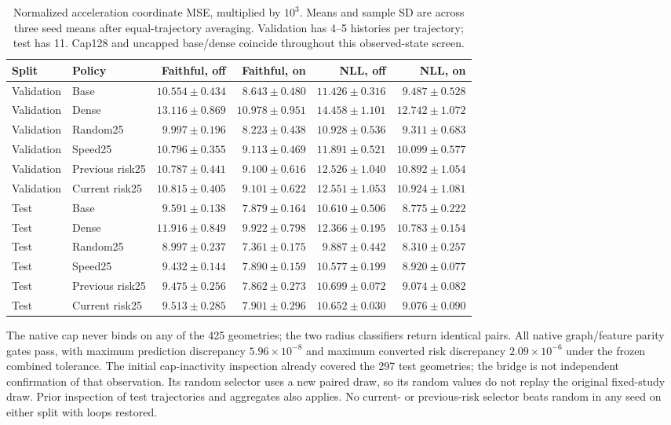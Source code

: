\begin{table}[ht]
\centering\small
\caption{Normalized acceleration coordinate MSE, multiplied by $10^3$.
Means and sample SD are across three seed means after equal-trajectory
averaging. Validation has 4--5 histories per trajectory; test has 11.
Cap128 and uncapped base/dense coincide throughout this observed-state screen.}
\label{tab:graph-convention-bridge}
\begin{tabular}{llrrrr}
\toprule
Split & Policy & Faithful, off & Faithful, on & NLL, off & NLL, on\\
\midrule
Validation & Base & $10.554\pm0.434$ & $8.643\pm0.480$ & $11.426\pm0.316$ & $9.487\pm0.528$\\
Validation & Dense & $13.116\pm0.869$ & $10.978\pm0.951$ & $14.458\pm1.101$ & $12.742\pm1.072$\\
Validation & Random25 & $9.997\pm0.196$ & $8.223\pm0.438$ & $10.928\pm0.536$ & $9.311\pm0.683$\\
Validation & Speed25 & $10.796\pm0.355$ & $9.113\pm0.469$ & $11.891\pm0.521$ & $10.099\pm0.577$\\
Validation & Previous risk25 & $10.787\pm0.441$ & $9.100\pm0.616$ & $12.526\pm1.040$ & $10.892\pm1.054$\\
Validation & Current risk25 & $10.815\pm0.405$ & $9.101\pm0.622$ & $12.551\pm1.053$ & $10.924\pm1.081$\\
\midrule
Test & Base & $9.591\pm0.138$ & $7.879\pm0.164$ & $10.610\pm0.506$ & $8.775\pm0.222$\\
Test & Dense & $11.916\pm0.849$ & $9.922\pm0.798$ & $12.366\pm0.195$ & $10.783\pm0.154$\\
Test & Random25 & $8.997\pm0.237$ & $7.361\pm0.175$ & $9.887\pm0.442$ & $8.310\pm0.257$\\
Test & Speed25 & $9.432\pm0.144$ & $7.890\pm0.159$ & $10.577\pm0.199$ & $8.920\pm0.077$\\
Test & Previous risk25 & $9.475\pm0.256$ & $7.862\pm0.273$ & $10.699\pm0.072$ & $9.074\pm0.082$\\
Test & Current risk25 & $9.513\pm0.285$ & $7.901\pm0.296$ & $10.652\pm0.030$ & $9.076\pm0.090$\\
\midrule
\end{tabular}
\end{table}

The native cap never binds on any of the 425 geometries; the two radius
classifiers return identical pairs. All native graph/feature parity gates pass,
with maximum prediction discrepancy $5.96\times10^{-8}$ and maximum converted
risk discrepancy $2.09\times10^{-6}$ under the frozen combined tolerance.
The initial cap-inactivity inspection already covered the 297 test geometries;
the bridge is not independent confirmation of that observation. Its random
selector uses a new paired draw, so its random values do not replay the
original fixed-study draw. Prior inspection of test trajectories and aggregates
also applies. No current- or previous-risk selector beats random in any seed
on either split with loops restored.

